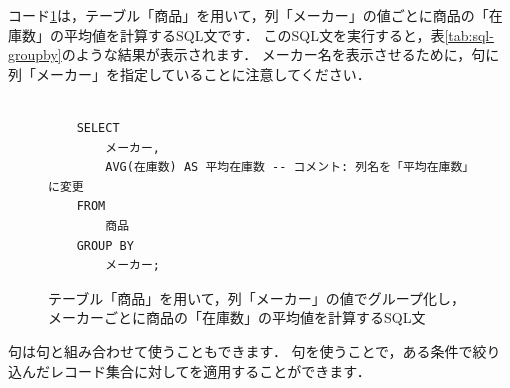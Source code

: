 コード\ref{code:sql-groupby}は，テーブル「商品」を用いて，列「メーカー」の値ごとに商品の「在庫数」の平均値を計算するSQL文です．
このSQL文を実行すると，表\ref{tab:sql-groupby}のような結果が表示されます．
メーカー名を表示させるために，句に列「メーカー」を指定していることに注意してください．
\begin{figure}[!htbp]
    \begin{verbatim}

    SELECT
        メーカー,
        AVG(在庫数) AS 平均在庫数 -- コメント: 列名を「平均在庫数」に変更
    FROM
        商品
    GROUP BY
        メーカー;

    \end{verbatim}
    \captionsetup{name=コード}
    \caption{テーブル「商品」を用いて，列「メーカー」の値でグループ化し，メーカーごとに商品の「在庫数」の平均値を計算するSQL文}
    \label{code:sql-groupby}
\end{figure}
\begin{table}[!htbp]
    \centering
    \caption{テーブル「商品」を用いて，列「メーカー」の値でグループ化し，メーカーごとに商品の「在庫数」の平均値を計算した結果}
    \label{tab:sql-groupby}
\end{table}

句は句と組み合わせて使うこともできます．
句を使うことで，ある条件で絞り込んだレコード集合に対してを適用することができます．

